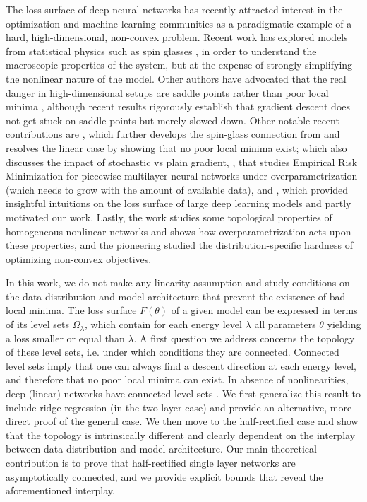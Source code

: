 The loss surface of deep neural networks has recently attracted interest 
in the optimization and machine learning communities as a paradigmatic example of 
a hard, high-dimensional, non-convex problem. 
Recent work has explored models from statistical physics such as spin glasses \cite{choromanska2015loss}, 
in order to understand the macroscopic properties of the system, but at the expense of strongly simplifying the nonlinear nature of the model. Other authors have advocated 
that the real danger in high-dimensional setups are saddle points 
rather than poor local minima \cite{dauphin2014identifying}, although 
recent results rigorously establish that gradient descent does not 
get stuck on saddle points \cite{lee2016gradient} but merely slowed down. 
Other notable recent contributions are \cite{kawaguchi2016deep}, which further develops the spin-glass 
connection from \cite{choromanska2015loss} and resolves the linear case by showing that no poor local minima exist; \cite{sagun2014explorations} which also discusses the impact of stochastic vs plain gradient,  \cite{soudry2016no}, that studies Empirical Risk Minimization for piecewise multilayer neural networks under overparametrization (which needs to grow with the amount of available data),  
and \cite{goodfellow2014qualitatively}, which provided insightful intuitions on the loss surface of large deep learning models and partly motivated our work. Lastly, the work \cite{safran2015quality} studies some topological 
properties of homogeneous nonlinear networks and shows how overparametrization acts upon these properties, and the pioneering \cite{shamir2} studied the distribution-specific hardness of optimizing non-convex objectives.

In this work, we do not make any linearity assumption and study conditions 
on the data distribution and model architecture that prevent the existence 
of bad local minima. 
The loss surface $F(\theta)$ of a given model can be expressed in terms of its level sets $\Omega_\lambda$, which contain for each energy level $\lambda$ all parameters $\theta$ yielding a loss smaller or equal than $\lambda$. A first question we address concerns the topology of these level sets, i.e. under which conditions they are connected. Connected level sets imply that one can always find a descent direction at each energy level, and therefore that no poor local minima can exist. In absence of nonlinearities, deep (linear) networks have connected level sets \cite{kawaguchi2016deep}. We first generalize this result to include ridge regression (in the two layer case) and provide an alternative, more direct proof of the general case. We then move to the half-rectified case and show that the topology is intrinsically different and clearly dependent on the interplay between data distribution and model architecture. Our main theoretical contribution is to prove that half-rectified single layer networks are asymptotically connected, and we provide explicit bounds that reveal the aforementioned interplay.


